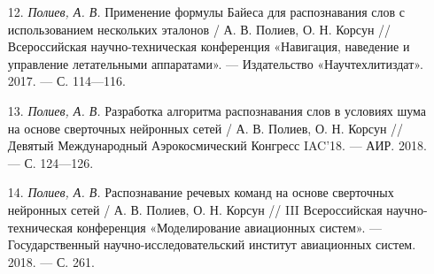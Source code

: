 \begin{enumerate}[wide, labelindent=0pt, leftmargin=*]
	\item[12.] \label{poliyev2017bayes} \textit{Полиев, А. В.} Применение формулы Байеса для распознавания слов с использованием нескольких эталонов / А. В. Полиев, О. Н. Корсун // Всероссийская научно-техническая конференция «Навигация, наведение и управление летательными аппаратами». — Издательство «Научтехлитиздат». 2017. — С. 114—116.
	\item[13.] \label{poliyev2018cnn} \textit{Полиев, А. В.} Разработка алгоритма распознавания слов в условиях шума на основе сверточных нейронных сетей / А. В. Полиев, О. Н. Корсун // Девятый Международный Аэрокосмический Конгресс IAC’18. — АИР. 2018. — С. 124—126.
	\item[14.] \label{poliyev2018cnn2} \textit{Полиев, А. В.} Распознавание речевых команд на основе сверточных нейронных сетей / А. В. Полиев, О. Н. Корсун // III Всероссийская научно-техническая конференция «Моделирование авиационных систем». — Государственный научно-исследовательский институт авиационных систем. 2018. — С. 261.
\end{enumerate}

